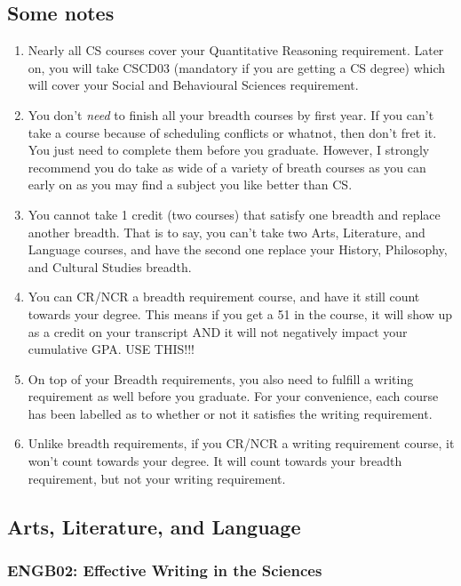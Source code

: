 \documentclass[11pt]{article}
\begin{document}
\subsection{Some notes}
\begin{enumerate}
\item Nearly all CS courses cover your Quantitative Reasoning
requirement. Later on, you will take CSCD03 (mandatory if you are
getting a CS degree) which will cover your Social and Behavioural
Sciences requirement.

\item You don't \textit{need} to finish all your breadth courses by
first year. If you can't take a course because of scheduling conflicts
or whatnot, then don't fret it. You just need to complete them before
you graduate. However, I strongly recommend you do take as wide of a
variety of breath courses as you can early on as you may find a subject
you like better than CS.

\item You cannot take 1 credit (two courses) that satisfy one breadth
and replace another breadth. That is to say, you can't take two Arts,
Literature, and Language courses, and have the second one replace your
History, Philosophy, and Cultural Studies breadth.

\item You can CR/NCR a breadth requirement course, and have it still
count towards your degree. This means if you get a 51 in the course, it
will show up as a credit on your transcript AND it will not negatively
impact your cumulative GPA. USE THIS!!!

\item On top of your Breadth requirements, you also need to fulfill a
writing requirement as well before you graduate. For your convenience,
each course has been labelled as to whether or not it satisfies the
writing requirement.

\item Unlike breadth requirements, if you CR/NCR a writing requirement
course, it won't count towards your degree. It will count towards your
breadth requirement, but not your writing requirement.
\end{enumerate}

\subsection{Arts, Literature, and Language}
\subsubsection{ENGB02: Effective Writing in the Sciences}
\end{document}
